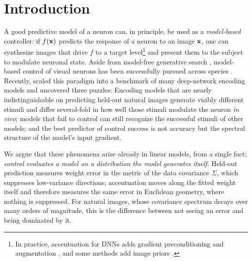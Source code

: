 \section{Introduction}
A good predictive model of a neuron can, in principle, be used as a \textit{model-based} controller: if $f(\mathbf{x})$ predicts the response of a neuron to an image $\mathbf{x}$, one can synthesize images that drive $f$ to a target level\footnote{In practice, accentuation for DNNs adds gradient preconditioning and augmentation \citep{hamblin2024feature,fel2023magnitudeConstrainedOptimization}, and some methods add image priors \citep{bashivan2019neuralPopulationControl}.} and present them to the subject to modulate neuronal state.
Aside from model-free generative search \citep{ponce2019evolvingImages,xiao2020xdream}, model-based control of visual neurons has been successfully pursued across species \citep{bashivan2019neuralPopulationControl,walker2019inceptionLoops}. Recently, \citetPW scaled this paradigm into a benchmark of many deep-network encoding models and uncovered three puzzles: Encoding models that are nearly indistinguishable on predicting held-out natural images generate visibly different stimuli and differ several-fold in how well those stimuli modulate the neuron \textit{in vivo}; models that fail to control can still recognize the successful stimuli of other models; and the best predictor of control success is not accuracy but the spectral structure of the model's input gradient.

We argue that these phenomena arise already in linear models, from a single fact: \emph{control evaluates a model on a distribution the model generates itself}. Held-out prediction measures weight error in the metric of the data covariance $\Sigma$, which suppresses low-variance directions; accentuation moves along the fitted weight itself and therefore measures the same error in Euclidean geometry, where nothing is suppressed. For natural images, whose covariance spectrum decays over many orders of magnitude, this is the difference between not seeing an error and being dominated by it.

